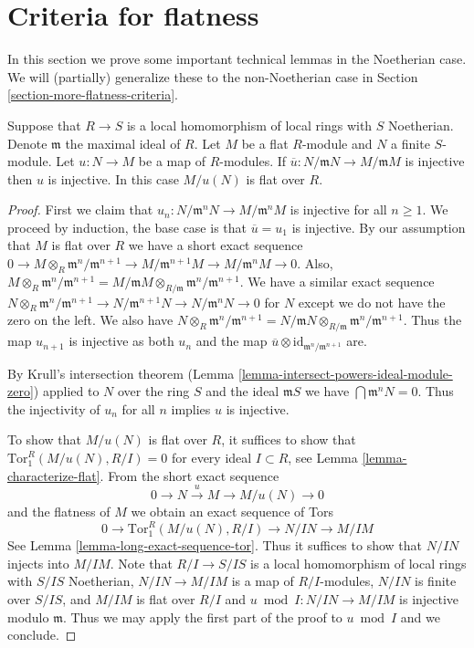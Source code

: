 \section{Criteria for flatness}
\label{section-criteria-flatness}

\noindent
In this section we prove some important technical lemmas in the Noetherian
case. We will (partially) generalize these to the non-Noetherian case
in Section \ref{section-more-flatness-criteria}.

\begin{lemma}
\label{lemma-mod-injective}
Suppose that $R \to S$ is a local homomorphism of local rings with $S$
Noetherian.
Denote $\mathfrak m$ the maximal ideal of $R$. Let $M$ be a flat $R$-module
and $N$ a finite $S$-module. Let $u : N \to M$ be a map of $R$-modules.
If $\overline{u} : N/\mathfrak m N \to M/\mathfrak m M$
is injective then $u$ is injective.
In this case $M/u(N)$ is flat over $R$.
\end{lemma}

\begin{proof}
First we claim that $u_n : N/{\mathfrak m}^nN \to M/{\mathfrak m}^nM$
is injective for all $n \geq 1$. We proceed by induction, the base
case is that $\overline{u} = u_1$ is injective. By our assumption that $M$
is flat over $R$ we have  a short exact sequence
$0 \to M \otimes_R {\mathfrak m}^n/{\mathfrak m}^{n + 1}
\to M/{\mathfrak m}^{n + 1}M \to M/{\mathfrak m}^n M \to 0$.
Also, $M \otimes_R {\mathfrak m}^n/{\mathfrak m}^{n + 1}
= M/{\mathfrak m}M \otimes_{R/{\mathfrak m}}
{\mathfrak m}^n/{\mathfrak m}^{n + 1}$. We have
a similar exact sequence $N \otimes_R {\mathfrak m}^n/{\mathfrak m}^{n + 1}
\to N/{\mathfrak m}^{n + 1}N \to N/{\mathfrak m}^n N \to 0$
for $N$ except we do not have the zero on the left. We also
have $N \otimes_R {\mathfrak m}^n/{\mathfrak m}^{n + 1}
= N/{\mathfrak m}N \otimes_{R/{\mathfrak m}}
{\mathfrak m}^n/{\mathfrak m}^{n + 1}$. Thus the map $u_{n + 1}$ is
injective as both $u_n$ and the map
$\overline{u} \otimes \text{id}_{{\mathfrak m}^n/{\mathfrak m}^{n + 1}}$ are.

\medskip\noindent
By Krull's intersection theorem
(Lemma \ref{lemma-intersect-powers-ideal-module-zero})
applied to $N$ over the ring $S$ and the ideal $\mathfrak mS$
we have $\bigcap \mathfrak m^nN = 0$. Thus the injectivity
of $u_n$ for all $n$ implies $u$ is injective.

\medskip\noindent
To show that $M/u(N)$ is flat over $R$, it suffices to show that
$\text{Tor}_1^R(M/u(N), R/I) = 0$ for every ideal $I \subset R$,
see Lemma \ref{lemma-characterize-flat}. From the short exact sequence
$$
0 \to N \xrightarrow{u} M \to M/u(N) \to 0
$$
and the flatness of $M$ we obtain an exact sequence of Tors
$$
0 \to \text{Tor}_1^R(M/u(N), R/I) \to N/IN \to M/IM
$$
See Lemma \ref{lemma-long-exact-sequence-tor}. Thus it suffices to show that
$N/IN$ injects into $M/IM$. Note that $R/I \to S/IS$ is a local
homomorphism of local rings with $S/IS$ Noetherian, $N/IN \to M/IM$ is a map
of $R/I$-modules, $N/IN$ is finite over $S/IS$, and $M/IM$ is flat over
$R/I$ and $u \bmod I : N/IN \to M/IM$ is injective modulo $\mathfrak m$.
Thus we may apply the first part of the proof to $u \bmod I$ and we conclude.
\end{proof}

